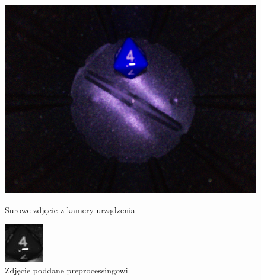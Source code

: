 \begin{figure}[H]
    \centering
    \begin{minipage}[t]{0.45\linewidth}
        \centering
        \includegraphics[width=\linewidth]{chapters/04-czytanie/figures/4raw}
        \caption{Surowe zdjęcie z kamery urządzenia}
        \label{fig:4raw}
    \end{minipage}
    \hfill
    \begin{minipage}[t]{0.45\linewidth}
        \centering
        \includegraphics[width=\linewidth]{chapters/04-czytanie/figures/4processed}
        \caption{Zdjęcie poddane preprocessingowi}
        \label{fig:4proc}
    \end{minipage}
\end{figure}


